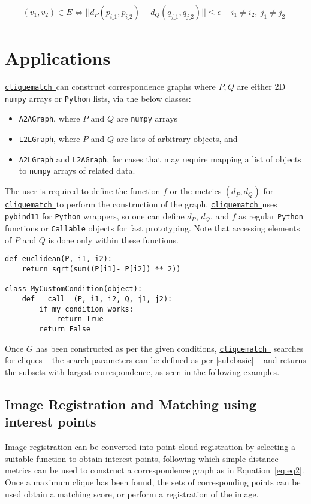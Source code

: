 \documentclass[12pt]{article}
\newcommand{\clqm}{\href{https://github.com/ahgamut/cliquematch}{\texttt{cliquematch}~}}
\begin{document}
\begin{align}
	\label{eq:eq2}
	(v_1, v_2) \in E \iff || d_P(p_{i\_1}, p_{i\_2}) -
	d_Q(q_{j\_1}, q_{j\_2}) || \leq \epsilon ~~ &
	i_1 \ne i_2,\  j_1 \ne j_2 ~~
\end{align}

\section{Applications}%
\label{sec:applications}

\clqm can construct correspondence graphs where $P, Q$ are either 2D
\texttt{numpy} arrays or \texttt{Python} lists, via the below classes:
\begin{itemize}
	\item \texttt{A2AGraph}, where $P$ and $Q$ are
	      \texttt{numpy} arrays
	\item \texttt{L2LGraph}, where $P$ and $Q$ are lists
	      of arbitrary objects, and
	\item \texttt{A2LGraph} and \texttt{L2AGraph}, for cases that may require mapping a
	      list of objects to \texttt{numpy} arrays of related data.
\end{itemize}

The user is required to define the function $f$ or the metrics
$(d_P, d_Q)$ for \clqm to perform the construction of the graph.  \clqm uses
\texttt{pybind11} for \texttt{Python} wrappers, so one can define
$d_P$, $d_Q$, and $f$ as regular
\texttt{Python} functions or \texttt{Callable} objects for fast
prototyping. Note that accessing elements of $P$ and
$Q$ is done only within these functions.

\begin{verbatim}
def euclidean(P, i1, i2): 
    return sqrt(sum((P[i1]- P[i2]) ** 2))

class MyCustomCondition(object):
    def __call__(P, i1, i2, Q, j1, j2): 
        if my_condition_works: 
            return True 
        return False
\end{verbatim}

Once $G$ has been constructed as per the given conditions, \clqm
searches for cliques -- the search parameters can be defined as per
\autoref{sub:basic} -- and returns the subsets with largest correspondence, as seen
in the following examples.

\subsection{Image Registration and Matching using interest points}%
\label{sub:imregister}
Image registration can be converted into point-cloud registration by selecting a suitable
function to obtain interest points, following which simple distance metrics can be used
to construct a correspondence graph as in Equation~\ref{eq:eq2}. Once a
maximum clique has been found, the sets of corresponding points can be used obtain a
matching score, or perform a registration of the image.
\end{document}
